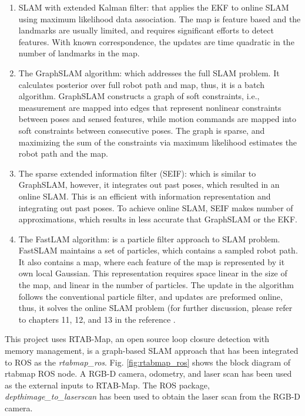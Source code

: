\documentclass[10pt,journal,compsoc]{IEEEtran}
\begin{document}
\begin{enumerate} \item SLAM with extended Kalman filter: that applies the EKF to online SLAM using maximum likelihood data association. The map is feature based and the landmarks are usually limited, and requires significant efforts to detect features. With known correspondence, the updates are time quadratic in the number of landmarks in the map.  \item The GraphSLAM algorithm: which addresses the full SLAM problem. It calculates posterior over full robot path and map, thus, it is a batch algorithm. GraphSLAM constructs a graph of soft constraints, i.e., measurement are mapped into edges that represent nonlinear constraints between poses and sensed features, while motion commands are mapped into soft constraints between consecutive poses. The graph is sparse, and maximizing the sum of the constraints via maximum likelihood estimates the robot path and the map.  \item The sparse extended information filter (SEIF): which is similar to GraphSLAM, however, it integrates out past poses, which resulted in an online SLAM. This is an efficient with information representation and integrating out past poses. To achieve online SLAM, SEIF makes number of approximations, which results in less accurate that GraphSLAM or the EKF.  \item The FastLAM algorithm: is a particle filter approach to SLAM problem. FastSLAM maintains a set of particles, which contains a sampled robot path. It also contains a map, where each feature of the map is represented by it own local Gaussian. This representation requires space linear in the size of the map, and linear in the number of particles. The update in the algorithm follows the conventional particle filter, and updates are preformed online, thus, it solves the online SLAM problem (for further discussion, please refer to chapters 11, 12, and 13 in the reference \cite{Thrun:2005:PR:1121596}.\end{enumerate} 

This project uses RTAB-Map, an open source loop closure detection with memory management, is a graph-based SLAM approach that has been integrated to ROS as the  \textit{rtabmap\_ros}. Fig. \ref{fig:rtabmap_ros} shows the block diagram of rtabmap ROS node.  A RGB-D camera, odometry, and laser scan has been used as the external inputs to RTAB-Map. The ROS package, \textit{depthimage\_to\_laserscan} has been used to obtain the laser scan from the RGB-D camera.  
\end{document}
